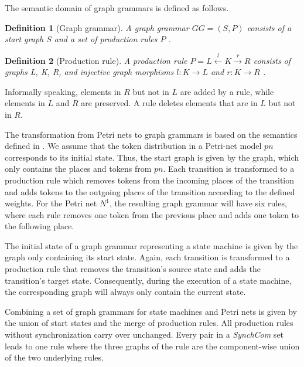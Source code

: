 \documentclass[conference]{IEEEtran}
\newtheorem{definition}{Definition}
\begin{document}
The semantic domain of graph grammars is defined as follows.
\begin{definition}[Graph grammar] \label{def:graphGrammar}
A graph grammar $GG=(S, P)$ consists of a start graph $S$ and a set of production rules $P$ \cite{ehrigGraphGrammarsPetri2004}. 
\end{definition}
\begin{definition}[Production rule] \label{def:productionRule}
A production rule $P= L \overset{l}{\leftarrow} K \overset{r}{\to} R$ consists of graphs L, K, R, and injective graph morphisms $l: K \to L$ and $r: K \to R$ \cite{ehrigGraphGrammarsPetri2004}. 
\end{definition}

Informally speaking, elements in $R$ but not in $L$ are added by a rule, while elements in $L$ and $R$ are preserved.
A rule deletes elements that are in $L$ but not in $R$.

The transformation from Petri nets to graph grammars is based on the semantics defined in \cite{ehrigGraphGrammarsPetri2004}.
We assume that the token distribution in a Petri-net model $pn$ corresponds to its initial state.
Thus, the start graph is given by the graph, which only contains the places and tokens from $pn$.
Each transition is transformed to a production rule which removes tokens from the incoming places of the transition and adds tokens to the outgoing places of the transition according to the defined weights.
For the Petri net $N^1$, the resulting graph grammar will have six rules, where each rule removes one token from the previous place and adds one token to the following place.

The initial state of a graph grammar representing a state machine is given by the graph only containing its start state.
Again, each transition is transformed to a production rule that removes the transition's source state and adds the transition's target state.
Consequently, during the execution of a state machine, the corresponding graph will always only contain the current state.

Combining a set of graph grammars for state machines and Petri nets is given by the union of start states and the merge of production rules.
All production rules without synchronization carry over unchanged.
Every pair in a \textit{SynchCom} set leads to one rule where the three graphs of the rule are the component-wise union of the two underlying rules.
\end{document}
